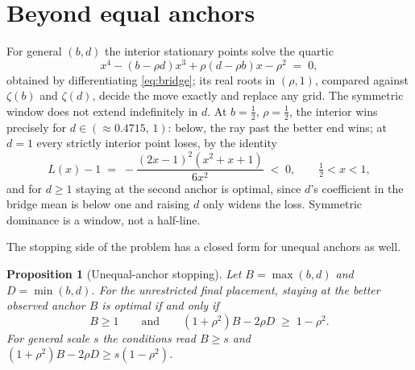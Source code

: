 \documentclass[11pt]{article}
\theoremstyle{itheads}
\newtheorem{proposition}{Proposition}
\begin{document}
\section{Beyond equal anchors}

For general $\left(b,d\right)$ the interior stationary points solve
the quartic
\begin{equation}\label{eq:quartic}
x^{4}-\left(b-\rho d\right)x^{3}+\rho\left(d-\rho b\right)x-\rho^{2}
\;=\;0,
\end{equation}
obtained by differentiating \eqref{eq:bridge}; its real roots in
$\left(\rho,1\right)$, compared against $\zeta(b)$ and $\zeta(d)$,
decide the move exactly and replace any grid. The symmetric window
does not extend indefinitely in $d$. At $b=\tfrac12$,
$\rho=\tfrac12$, the interior wins precisely for
$d\in\left(\approx 0.4715,\,1\right)$: below, the ray past the better end
wins; at $d=1$ every strictly interior point loses, by the identity
\begin{equation}
L(x)-1 \;=\;
-\frac{\left(2x-1\right)^{2}\left(x^{2}+x+1\right)}{6x^{2}}
\;<\;0, \qquad \tfrac12<x<1,
\end{equation}
and for $d\ge 1$ staying at the second anchor is optimal, since
$d$'s coefficient in the bridge mean is below one and raising $d$
only widens the loss. Symmetric dominance is a window, not a half-line.

The stopping side of the problem has a closed form for unequal
anchors as well.

\begin{proposition}[Unequal-anchor stopping]\label{prop:stop}
Let $B=\max(b,d)$ and $D=\min(b,d)$. For the unrestricted final
placement, staying at the better observed anchor $B$ is optimal if and
only if
\begin{equation}\label{eq:stop}
B\ge 1 \qquad\text{and}\qquad
\left(1+\rho^{2}\right)B-2\rho D \;\ge\; 1-\rho^{2}.
\end{equation}
For general scale $s$ the conditions read $B\ge s$ and
$\left(1+\rho^{2}\right)B-2\rho D\ge s\left(1-\rho^{2}\right)$.
\end{proposition}
\end{document}

